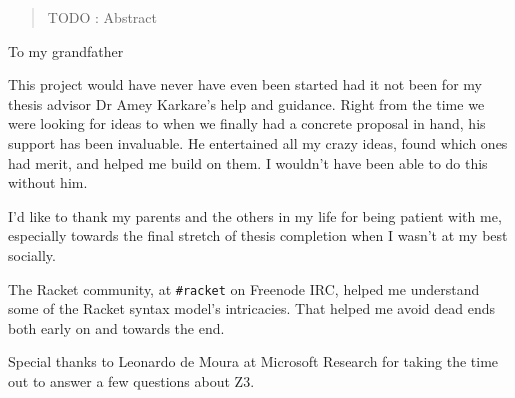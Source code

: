 \begin{abstract}
TODO : Abstract
\end{abstract}

\begin{dedication}
To my grandfather
\end{dedication}

\begin{acknowledgments}

This project would have never have even been started had it not been for my
thesis advisor Dr Amey Karkare's help and guidance. Right from the time we
were looking for ideas to when we finally had a concrete proposal in hand, his
support has been invaluable. He entertained all my crazy ideas, found which
ones had merit, and helped me build on them. I wouldn't have been able to do
this without him.

I'd like to thank my parents and the others in my life for being patient with
me, especially towards the final stretch of thesis completion when I wasn't at
my best socially.

The Racket community, at \texttt{\#racket} on Freenode IRC, helped me
understand some of the Racket syntax model's intricacies. That helped me avoid
dead ends both early on and towards the end.

Special thanks to Leonardo de Moura at Microsoft Research for taking the time
out to answer a few questions about Z3.

\end{acknowledgments}

\tableofcontents
\listoftables

\cleardoublepage
{} \label{listoffig}

\cleardoublepage{} %

